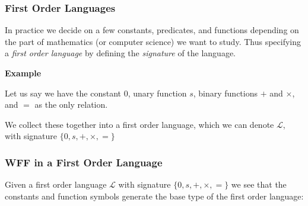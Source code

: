 \documentclass{beamer}
\theoremstyle{indentDefn} \newtheorem{defn}[]{Definition}
\begin{document}
\begin{frame}
	\frametitle{First Order Languages}
	
	In practice we decide on a few constants, predicates, and functions depending on the part of mathematics (or computer science) we want to study. Thus specifying a \emph{first order language} by defining the \emph{signature} of the language.
	
	{\bf Example} 
	
	Let us say we have the constant $0$, unary function $s$, binary functions $+$ and $\times$, and $=$ as the only relation.
	\vspace{0.5cm}	
	
	We collect these together into a first order language, which we can denote $\mathcal{L}$, with signature $\{0,s,+,\times,=\}$
	\vspace{10mm}
	
	
\end{frame}

\begin{frame}
	\frametitle{WFF in a First Order Language}
	
	Given a first order language $\mathcal{L}$ with signature $\{0,s,+,\times,=\}$ we see that the constants and function symbols generate the base type of the first order language: 
	
	\vspace{60mm}

		
\end{frame}
\end{document}
